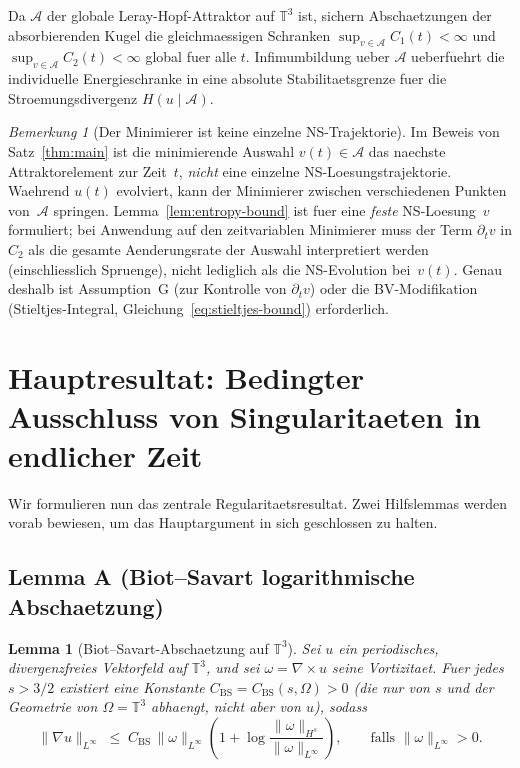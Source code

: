\documentclass[12pt,a4paper]{article}
\theoremstyle{definition}
\theoremstyle{plain}
\newtheorem{lemma}[definition]{Lemma}
\theoremstyle{remark}
\newtheorem{remark}[definition]{Bemerkung}
\begin{document}
Da $\mathcal{A}$ der globale Leray-Hopf-Attraktor auf $\mathbb{T}^3$ ist, sichern Abschaetzungen der absorbierenden Kugel die gleichmaessigen Schranken $\sup_{v \in \mathcal{A}} C_1(t) < \infty$ und $\sup_{v \in \mathcal{A}} C_2(t) < \infty$ global fuer alle $t$. Infimumbildung ueber $\mathcal{A}$ ueberfuehrt die individuelle Energieschranke in eine absolute Stabilitaetsgrenze fuer die Stroemungsdivergenz $H(u \mid \mathcal{A})$.

\begin{remark}[Der Minimierer ist keine einzelne NS-Trajektorie]
\label{rem:minimiser-trajectory}
Im Beweis von Satz~\ref{thm:main} ist die minimierende Auswahl
$v(t) \in \mathcal{A}$ das naechste Attraktorelement zur Zeit~$t$,
\emph{nicht} eine einzelne NS-Loesungstrajektorie. Waehrend $u(t)$ evolviert,
kann der Minimierer zwischen verschiedenen Punkten von~$\mathcal{A}$ springen.
Lemma~\ref{lem:entropy-bound} ist fuer eine \emph{feste} NS-Loesung~$v$
formuliert; bei Anwendung auf den zeitvariablen Minimierer muss der Term
$\partial_t v$ in $C_2$ als die gesamte Aenderungsrate der Auswahl
interpretiert werden (einschliesslich Spruenge), nicht lediglich als die
NS-Evolution bei~$v(t)$. Genau deshalb ist Assumption~G (zur Kontrolle
von $\partial_t v$) oder die BV-Modifikation (Stieltjes-Integral,
Gleichung~\eqref{eq:stieltjes-bound}) erforderlich.
\end{remark}

\section{Hauptresultat: Bedingter Ausschluss von Singularitaeten in endlicher Zeit}

Wir formulieren nun das zentrale Regularitaetsresultat. Zwei Hilfslemmas werden
vorab bewiesen, um das Hauptargument in sich geschlossen zu halten.

\subsection*{Lemma A (Biot--Savart logarithmische Abschaetzung)}
\begin{lemma}[Biot--Savart-Abschaetzung auf $\mathbb{T}^3$]
\label{lem:BS}
Sei $u$ ein periodisches, divergenzfreies Vektorfeld auf $\mathbb{T}^3$, und sei
$\omega = \nabla\times u$ seine Vortizitaet. Fuer jedes $s > 3/2$ existiert eine
Konstante $C_{\mathrm{BS}} = C_{\mathrm{BS}}(s,\Omega) > 0$ (die nur von
$s$ und der Geometrie von $\Omega = \mathbb{T}^3$ abhaengt, \emph{nicht} aber von $u$), sodass
\begin{equation}\label{eq:BS}
    \|\nabla u\|_{L^\infty}
    \;\le\;
    C_{\mathrm{BS}}\,\|\omega\|_{L^\infty}
    \!\left(1 + \log\frac{\|\omega\|_{H^s}}{\|\omega\|_{L^\infty}}\right),
    \qquad \text{falls } \|\omega\|_{L^\infty} > 0.
\end{equation}
\end{lemma}
\end{document}
